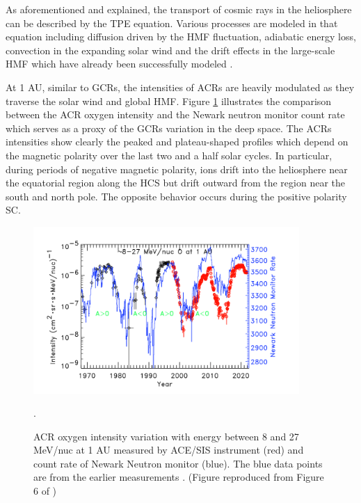 As aforementioned and explained, the transport of cosmic rays in the heliosphere can be described by the \ac{TPE} equation. Various processes are modeled in that equation including diffusion driven by the \ac{HMF} fluctuation, adiabatic energy loss, convection in the expanding solar wind and the drift effects in the large-scale \ac{HMF} which have already been successfully modeled \citep{Parker1965Pss, Jokipii1977ApJ, Jokipii1981ApJ}.

At 1 AU, similar to \acp{GCR}, the intensities of \acp{ACR} are heavily modulated as they traverse the solar wind and global \ac{HMF}. Figure \ref{Fig:ACR_solarmodulation} illustrates the comparison between the \ac{ACR} oxygen intensity and the Newark neutron monitor count rate which serves as a proxy of the \acp{GCR} variation in the deep space. The \acp{ACR} intensities show clearly the peaked and plateau-shaped profiles which depend on the magnetic polarity over the last two and a half solar cycles. In particular, during periods of negative magnetic polarity, ions drift into the heliosphere near the equatorial region along the \ac{HCS} but drift outward from the region near the south and north pole. The opposite behavior occurs during the positive polarity \acl{SC}.



\begin{figure}
	\centering
	\includegraphics[width = 0.9\textwidth]{images/ACR_solarmodulation.png}
	\caption[Long term variation of \ac{ACR} oxygen and neutron monitor count rate]{ACR oxygen intensity variation with energy between 8 and 27 MeV/nuc at 1 AU measured by ACE/SIS instrument (red) and count rate of Newark Neutron monitor (blue). The blue data points are from the earlier measurements \citep{Mewaldt1993GeoRL}. (Figure reproduced from Figure 6 of \citet{Giacalone2022SSRv})}.
	\label{Fig:ACR_solarmodulation}
\end{figure}


